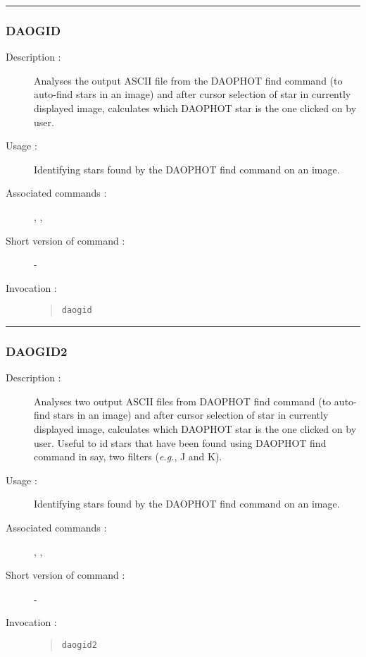 \hrule 
\subsubsection*{\label{DAOGID}DAOGID}

\begin{description}

\item[Description :] Analyses the output ASCII file from the DAOPHOT
find command (to auto-find stars in an image) and after cursor
selection of star in currently displayed image, calculates which
DAOPHOT star is the one clicked on by user.

\item[Usage :] Identifying stars found by the DAOPHOT find command on an image.

\item[Associated commands :] {\tt {}}, 
{\tt {}}, {\tt {}}

\item[Short version of command :] -

\item[Invocation :]

\begin{quote}{\tt  daogid }\end{quote}

\end{description}

\hrule 
\subsubsection*{\label{DAOGID2}DAOGID2}

\begin{description}

\item[Description :] Analyses two output ASCII files from DAOPHOT find
command (to auto-find stars in an image) and after cursor selection of
star in currently displayed image, calculates which DAOPHOT star is the
one clicked on by user.  Useful to id stars that have been found using
DAOPHOT find command in say, two filters (\emph{e.g.}, J and K).

\item[Usage :] Identifying stars found by the DAOPHOT find command on an image.
\item[Associated commands :] {\tt {}}, 
{\tt {}}, {\tt {}}

\item[Short version of command :] -

\item[Invocation :]

\begin{quote}{\tt  daogid2 }\end{quote}

\end{description}

